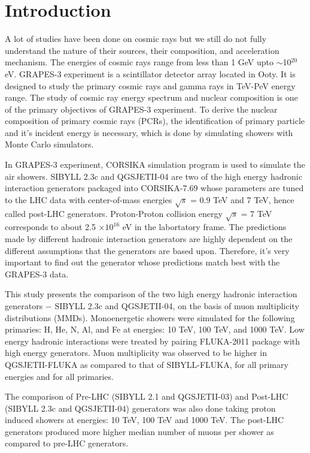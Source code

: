 \documentclass[12pt]{article}
\begin{document}
\section{Introduction}
A lot of studies have been done on cosmic rays but we still do not fully understand the nature of their sources, their composition, and acceleration mechanism. The energies of cosmic rays range from less than 1 GeV upto $\sim$10$^{20}$eV.  
GRAPES-3 experiment is a scintillator detector array located in Ooty. \cite{gupta} It is designed to study the primary cosmic rays and gamma rays in TeV-PeV energy range. The study of cosmic ray energy spectrum and nuclear composition is one of the primary objectives of GRAPES-3 experiment. To derive the nuclear composition of primary cosmic rays (PCRs), the identification of primary particle and it's incident energy is necessary, which is done by simulating showers with Monte Carlo simulators.

In GRAPES-3 experiment, CORSIKA simulation program is used to simulate the air showers. SIBYLL 2.3c and QGSJETII-04 are two of the high energy hadronic interaction generators packaged into CORSIKA-7.69 whose parameters are tuned to the LHC data with center-of-mass energies $\sqrt{s}$ = 0.9 TeV and 7 TeV,\cite{mthesis} hence called post-LHC generators. Proton-Proton collision energy $\sqrt{s}$ = 7 TeV corresponds to about 2.5 $\times 10^{16}$ eV in the labortatory frame. The predictions made by different hadronic interaction generators are highly dependent on the different assumptions that the generators are based upon. Therefore, it's very important to find out the generator whose predictions match best with the GRAPES-3 data. 

This study presents the comparison of the two high energy hadronic interaction generators $-$ SIBYLL 2.3c and QGSJETII-04,  on the basis of muon multiplicity distributions (MMDs). Monoenergetic showers were simulated for the following primaries: H, He, N, Al, and Fe at energies: 10 TeV, 100 TeV, and 1000 TeV. Low energy hadronic interactions were treated by pairing FLUKA-2011 package with high energy generators. Muon multiplicity was observed to be higher in QGSJETII-FLUKA as compared to that of SIBYLL-FLUKA, for all primary energies and for all primaries.

The comparison of Pre-LHC (SIBYLL 2.1 and QGSJETII-03) and Post-LHC (SIBYLL 2.3c and QGSJETII-04) generators was also done taking proton induced showers at energies: 10 TeV, 100 TeV and 1000 TeV. The post-LHC generators produced more higher median number of muons per shower as compared to pre-LHC generators.
\end{document}
